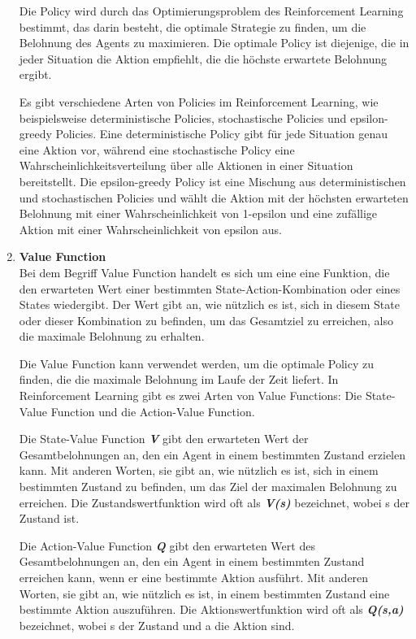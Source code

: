\begin{enumerate}
    Die Policy wird durch das Optimierungsproblem des Reinforcement Learning bestimmt, das darin besteht, die optimale Strategie zu finden, um die Belohnung des Agents zu maximieren. Die optimale Policy ist diejenige, die in jeder Situation die Aktion empfiehlt, die die höchste erwartete Belohnung ergibt.

    Es gibt verschiedene Arten von Policies im Reinforcement Learning, wie beispielsweise deterministische Policies, stochastische Policies und epsilon-greedy Policies. Eine deterministische Policy gibt für jede Situation genau eine Aktion vor, während eine stochastische Policy eine Wahrscheinlichkeitsverteilung über alle Aktionen in einer Situation bereitstellt. Die epsilon-greedy Policy ist eine Mischung aus deterministischen und stochastischen Policies und wählt die Aktion mit der höchsten erwarteten Belohnung mit einer Wahrscheinlichkeit von 1-epsilon und eine zufällige Aktion mit einer Wahrscheinlichkeit von epsilon aus.
    
    \item \textbf{Value Function}\\
    Bei dem Begriff Value Function handelt es sich um eine eine Funktion, die den erwarteten Wert einer bestimmten State-Action-Kombination oder eines States wiedergibt. Der Wert gibt an, wie nützlich es ist, sich in diesem State oder dieser Kombination zu befinden, um das Gesamtziel zu erreichen, also die maximale Belohnung zu erhalten.

    Die Value Function kann verwendet werden, um die optimale Policy zu finden, die die maximale Belohnung im Laufe der Zeit liefert. In Reinforcement Learning gibt es zwei Arten von Value Functions: Die State-Value Function und die Action-Value Function.
    
    Die State-Value Function \textbf{\textit{V}} gibt den erwarteten Wert der Gesamtbelohnungen an, den ein Agent in einem bestimmten Zustand erzielen kann. Mit anderen Worten, sie gibt an, wie nützlich es ist, sich in einem bestimmten Zustand zu befinden, um das Ziel der maximalen Belohnung zu erreichen. Die Zustandswertfunktion wird oft als \textbf{\textit{V(s)}} bezeichnet, wobei s der Zustand ist.
    
    Die Action-Value Function \textbf{\textit{Q}} gibt den erwarteten Wert des Gesamtbelohnungen an, den ein Agent in einem bestimmten Zustand erreichen kann, wenn er eine bestimmte Aktion ausführt. Mit anderen Worten, sie gibt an, wie nützlich es ist, in einem bestimmten Zustand eine bestimmte Aktion auszuführen. Die Aktionswertfunktion wird oft als \textbf{\textit{Q(s,a)}} bezeichnet, wobei s der Zustand und a die Aktion sind.
    

\end{enumerate}
